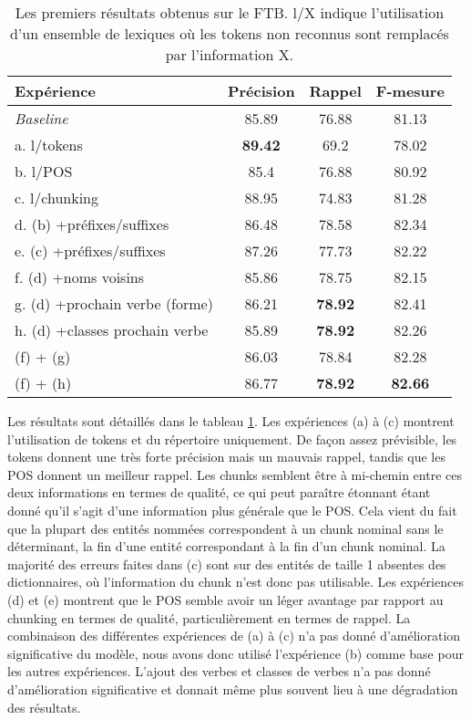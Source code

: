 \documentclass[citation\_needed]{subfiles}
\begin{document}
\begin{table}[ht!]
\centering
\begin{tabular}{|l|c|c|c|}
\hline
Expérience                & Précision & Rappel & F-mesure \\
\hline
\emph{Baseline}           & 85.89     & 76.88  & 81.13 \\
a. l/tokens                 & \textbf{89.42}     & 69.2   & 78.02 \\
b. l/POS                  & 85.4      & 76.88  & 80.92 \\
c. l/chunking             & 88.95     & 74.83  & 81.28 \\
d. (b) +préfixes/suffixes & 86.48     & 78.58  & 82.34 \\
e. (c) +préfixes/suffixes & 87.26     & 77.73  & 82.22 \\
\hline
f. (d) +noms voisins           & 85.86 & 78.75 & 82.15 \\
g. (d) +prochain verbe (forme) & 86.21 & \textbf{78.92} & 82.41 \\
h. (d) +classes prochain verbe & 85.89 & \textbf{78.92} & 82.26 \\
\hline
(f) + (g) & 86.03 & 78.84 & 82.28 \\
(f) + (h) & 86.77 & \textbf{78.92} & \textbf{82.66} \\
\hline
\end{tabular}
\caption{Les premiers résultats obtenus sur le FTB. l/X indique l'utilisation d'un ensemble de lexiques où les tokens non reconnus sont remplacés par l'information X.}
\label{tab:ftb-first-results}
\end{table}

Les résultats sont détaillés dans le tableau \ref{tab:ftb-first-results}. Les expériences (a) à (c) montrent l'utilisation de tokens et du répertoire uniquement. De façon assez prévisible, les tokens donnent une très forte précision mais un mauvais rappel, tandis que les POS donnent un meilleur rappel. Les chunks semblent être à mi-chemin entre ces deux informations en termes de qualité, ce qui peut paraître étonnant étant donné qu'il s'agit d'une information plus générale que le POS. Cela vient du fait que la plupart des entités nommées correspondent à un chunk nominal sans le déterminant, la fin d'une entité correspondant à la fin d'un chunk nominal. La majorité des erreurs faites dans (c) sont sur des entités de taille 1 absentes des dictionnaires, où l'information du chunk n'est donc pas utilisable. Les expériences (d) et (e) montrent que le POS semble avoir un léger avantage par rapport au chunking en termes de qualité, particulièrement en termes de rappel. La combinaison des différentes expériences de (a) à (c) n'a pas donné d'amélioration significative du modèle, nous avons donc utilisé l'expérience (b) comme base pour les autres expériences. L'ajout des verbes et classes de verbes n'a pas donné d'amélioration significative et donnait même plus souvent lieu à une dégradation des résultats.
\end{document}

